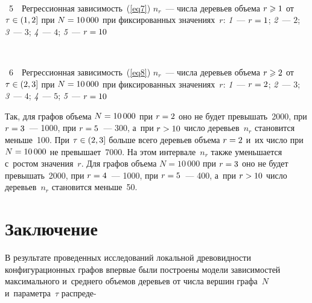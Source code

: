 \begin{multicols}{2}
{ \begin{center}  %
 \vspace*{-3pt}
    \mbox{%
\epsfxsize=79mm 
}

\end{center}



\noindent
{{\figurename~5}\ \ \small{Регрессионная зависимость~(\ref{eq7}) $n_r$~--- 
числа деревьев объема $r\hm\geqslant 1$ от $\tau\hm\in(1,2]$ при $N\hm=10\,000$ при 
фиксированных значениях~$r$: \textit{1}~--- $r\hm=1$;  \textit{2}~--- $2$;  \textit{3}~--- 
$3$;  \textit{4}~--- $4$;  \textit{5}~--- $r\hm=10$
}}}

\vspace*{6pt}

{ \begin{center}  %
 \vspace*{1pt}
     \mbox{%
\epsfxsize=79mm 
}

\end{center}



\noindent
{{\figurename~6}\ \ \small{Регрессионная зависимость~(\ref{eq8}) $n_r$~--- 
числа деревьев объема $r\hm\geqslant 2$ от $\tau\hm\in(2,3]$ при $N\hm=10\,000$ при 
фиксированных значениях~$r$:  \textit{1}~--- $r\hm=2$;  \textit{2}~--- $3$;  \textit{3}~--- 
$4$;  \textit{4}~--- $5$;  \textit{5}~--- $r\hm=10$
}}}

\vspace*{6pt}


\noindent
 Так, для графов объема $N\hm=10\,000$ при $r\hm=2$ оно не будет 
превышать~2000, при $r\hm=3$~--- 1000, при $r\hm=5$~--- 300, а~при $r\hm>10$ число 
деревьев~$n_r$ становится меньше~100.
При $\tau\hm\in(2,3]$ больше всего деревьев объема $r\hm=2$ и~их чис\-ло при $N\hm=10\,000$ 
не превышает~7000. На этом интервале~$n_r$ также уменьшается с~рос\-том значения~$r$. 
Для графов объема $N=10\,000$ при $r\hm=3$ оно не будет превышать~2000, при 
$r\hm=4$~--- 1000, при $r\hm=5$~--- 400, а~при $r\hm>10$ чис\-ло деревьев~$n_r$ становится 
меньше~50.

\vspace*{-6pt}


\section{Заключение}


В результате проведенных исследований локальной древовидности конфигурационных 
графов впервые были по\-стро\-ены модели зависимостей максимального и~среднего 
объемов деревьев от числа вершин графа~$N$ и~па\-ра\-мет\-ра~$\tau$ 
распреде-\linebreak\vspace*{-12pt}


\end{multicols}
